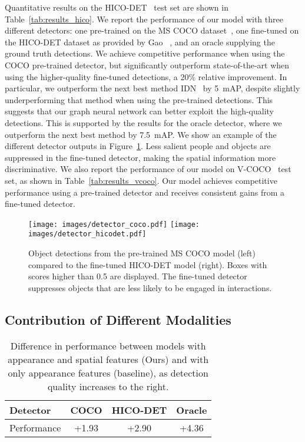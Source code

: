 \documentclass[10pt,twocolumn,letterpaper]{article}
\begin{document}
Quantitative results on the HICO-DET~\cite{chao2018} test set are shown in Table~\ref{tab:results_hico}. We report the performance of our model with three different detectors: one pre-trained on the MS COCO dataset~\cite{lin2014}, one fine-tuned on the HICO-DET dataset as provided by Gao \etal~\cite{gao2020}, and an oracle supplying the ground truth detections. We achieve competitive performance when using the COCO pre-trained detector, but significantly outperform state-of-the-art when using the higher-quality fine-tuned detections, a 20\% relative improvement. In particular, we outperform the next best method IDN~\cite{li2020} by 5~mAP, despite slightly underperforming that method when using the pre-trained detections. This suggests that our graph neural network can better exploit the high-quality detections. This is supported by the results for the oracle detector, where we outperform the next best method by 7.5~mAP. We show an example of the different detector outputs in Figure~\ref{fig:detector}. Less salient people and objects are suppressed in the fine-tuned detector, making the spatial information more discriminative. We also report the performance of our model on V-COCO~\cite{gupta2015} test set, as shown in Table~\ref{tab:results_vcoco}. Our model achieves competitive performance using a pre-trained detector and receives consistent gains from a fine-tuned detector.

\begin{figure}[!t]\centering
	\texttt{[image: images/detector\_coco.pdf]}\hfill
	\texttt{[image: images/detector\_hicodet.pdf]}
	\caption{Object detections from the pre-trained MS COCO model (left) compared to the fine-tuned HICO-DET model (right). Boxes with scores higher than 0.5 are displayed. The fine-tuned detector suppresses objects that are less likely to be engaged in interactions.}
	\label{fig:detector}
\end{figure}







\subsection{Contribution of Different Modalities}

\begin{table}[h!]\small
   \caption{Difference in performance between models with appearance and spatial features (Ours) and with only appearance features (baseline), as detection quality increases to the right.}
   \label{tab:perf_diff}
\setlength{\tabcolsep}{4pt} \begin{tabularx}{\linewidth}{l  C C C}
		\toprule
      Detector & \textbf{COCO} & \textbf{HICO-DET} & \textbf{Oracle} \\
      \midrule
		Performance  & +1.93 & +2.90 & +4.36 \\
		\bottomrule
	\end{tabularx}
\end{table}
\end{document}
